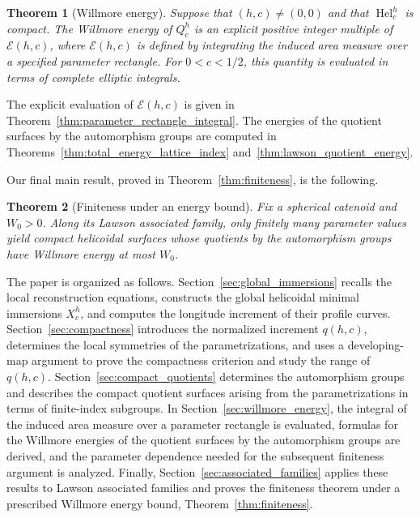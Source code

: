 \documentclass[a4paper,11pt]{amsart}
\numberwithin{equation}{section}
\theoremstyle{plain}
\newtheorem{mainthm}{Theorem}
\begin{document}
\begin{mainthm}[Willmore energy]\label{mainthm:willmore}
Suppose that $(h,c)\neq(0,0)$ and that
$\operatorname{Hel}_c^h$ is compact. The Willmore energy of $Q_{c}^{h}$ is an explicit positive integer
multiple of $\mathcal E(h,c)$, where $\mathcal E(h,c)$ is defined by
integrating the induced area measure over a specified parameter rectangle.
For $0<c<1/2$, this quantity is evaluated in terms of complete elliptic
integrals.
\end{mainthm}

The explicit evaluation of $\mathcal E(h,c)$ is given in
Theorem~\ref{thm:parameter_rectangle_integral}. The energies of the quotient surfaces by the automorphism groups are
computed in Theorems~\ref{thm:total_energy_lattice_index}
and~\ref{thm:lawson_quotient_energy}.

Our final main result, proved in
Theorem~\ref{thm:finiteness}, is the following.

\begin{mainthm}[Finiteness under an energy bound]
\label{mainthm:finiteness}
Fix a spherical catenoid and $W_0>0$. Along its Lawson associated
family, only finitely many parameter values yield compact helicoidal
surfaces whose quotients by the automorphism groups have Willmore
energy at most $W_0$.
\end{mainthm}

The paper is organized as follows. Section~\ref{sec:global_immersions}
recalls the local reconstruction equations, constructs the global helicoidal
minimal immersions $X_c^h$, and computes the longitude increment of their
profile curves. Section~\ref{sec:compactness} introduces the normalized
increment $q(h,c)$, determines the local symmetries of the parametrizations,
and uses a developing-map argument to prove the compactness criterion and study
the range of $q(h,c)$.
Section~\ref{sec:compact_quotients} determines the automorphism groups
and describes the compact quotient surfaces arising from the parametrizations
in terms of finite-index subgroups. In Section~\ref{sec:willmore_energy}, the
integral of the induced area measure over a parameter rectangle is evaluated,
formulas for the Willmore energies of the quotient surfaces by the
automorphism groups are derived, and the parameter dependence needed for the subsequent
finiteness argument is analyzed. Finally,
Section~\ref{sec:associated_families} applies these results to Lawson
associated families and proves the finiteness theorem under a prescribed
Willmore energy bound, Theorem~\ref{thm:finiteness}.
\end{document}
